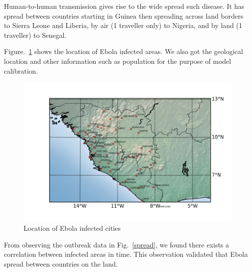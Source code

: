 \documentclass[12pt]{article}
\begin{document}
Human-to-human transmission gives rise to the wide spread such disease. It has spread between countries starting in Guinea then spreading across land borders to Sierra Leone and Liberia, by air (1 traveller only) to Nigeria, and by land (1 traveller) to Senegal.

Figure.~\ref{cities} shows the location of Ebola infected areas. We also got the geological location and other information such as population for the purpose of model calibration.

\begin{figure}[hbt]
\begin{center}
  \includegraphics[width=6in]{graph/map3.png}
  \caption{Location of Ebola infected cities}
  \label{cities}
\end{center}  
\end{figure}

From observing the outbreak data in Fig.~\ref{spread}, we found there exists a correlation  between infected areas in time. This observation validated that Ebola spread between countries on the land.
\end{document}
